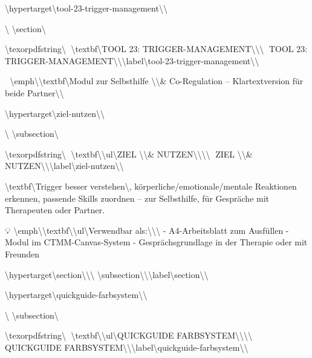 \textbackslash{}hypertarget\textbackslash{}{tool-23-trigger-management\textbackslash{}}\textbackslash{}{\textbackslash{}%
\textbackslash{}section\textbackslash{}{\textbackslash{}texorpdfstring\textbackslash{}{📄 \textbackslash{}textbf\textbackslash{}{TOOL 23: TRIGGER-MANAGEMENT\textbackslash{}}\textbackslash{}}{\textbackslash{}{📄 TOOL 23: TRIGGER-MANAGEMENT\textbackslash{}}\textbackslash{}}{\textbackslash{}label\textbackslash{}{tool-23-trigger-management\textbackslash{}}\textbackslash{}}

🧩 \textbackslash{}emph\textbackslash{}{\textbackslash{}textbf\textbackslash{}{Modul zur Selbsthilfe \textbackslash{}\textbackslash{}& Co-Regulation -- Klartextversion für beide Partner\textbackslash{}}\textbackslash{}}

\textbackslash{}hypertarget\textbackslash{}{ziel-nutzen\textbackslash{}}\textbackslash{}{\textbackslash{}%
\textbackslash{}subsection\textbackslash{}{\textbackslash{}texorpdfstring\textbackslash{}{🎯 \textbackslash{}textbf\textbackslash{}{\textbackslash{}ul\textbackslash{}{ZIEL \textbackslash{}\textbackslash{}& NUTZEN\textbackslash{}}\textbackslash{}}\textbackslash{}}{\textbackslash{}{🎯 ZIEL \textbackslash{}\textbackslash{}& NUTZEN\textbackslash{}}\textbackslash{}}{\textbackslash{}label\textbackslash{}{ziel-nutzen\textbackslash{}}\textbackslash{}}

\textbackslash{}textbf\textbackslash{}{Trigger besser verstehen\textbackslash{}}, körperliche/emotionale/mentale Reaktionen erkennen, passende Skills zuordnen -- zur Selbsthilfe, für Gespräche mit Therapeuten oder Partner.

💡 \textbackslash{}emph\textbackslash{}{\textbackslash{}textbf\textbackslash{}{\textbackslash{}ul\textbackslash{}{Verwendbar als:\textbackslash{}}\textbackslash{}}\textbackslash{}} - A4-Arbeitsblatt zum Ausfüllen - Modul im CTMM-Canvas-System - Gesprächsgrundlage in der Therapie oder mit Freunden

\textbackslash{}hypertarget\textbackslash{}{section\textbackslash{}}\textbackslash{}{\textbackslash{}%
\textbackslash{}subsection\textbackslash{}{\textbackslash{}}\textbackslash{}label\textbackslash{}{section\textbackslash{}}\textbackslash{}}

\textbackslash{}hypertarget\textbackslash{}{quickguide-farbsystem\textbackslash{}}\textbackslash{}{\textbackslash{}%
\textbackslash{}subsection\textbackslash{}{\textbackslash{}texorpdfstring\textbackslash{}{🧭 \textbackslash{}textbf\textbackslash{}{\textbackslash{}ul\textbackslash{}{QUICKGUIDE FARBSYSTEM\textbackslash{}}\textbackslash{}}\textbackslash{}}{\textbackslash{}{🧭 QUICKGUIDE FARBSYSTEM\textbackslash{}}\textbackslash{}}{\textbackslash{}label\textbackslash{}{quickguide-farbsystem\textbackslash{}}\textbackslash{}}

}}}}}}
